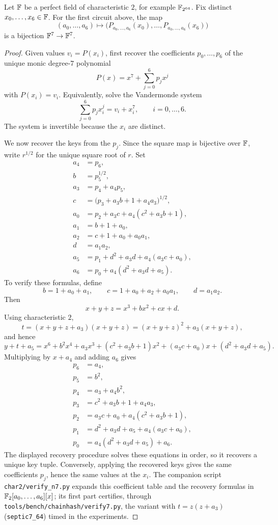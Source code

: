 \begin{lemma}\label{lem:first-char2-circuit-inverse}
Let $\mathbb{F}$ be a perfect field of characteristic $2$, for example $\mathbb{F}_{2^{64}}$.
Fix distinct $x_0,\ldots,x_6\in\mathbb{F}$.
For the first circuit above, the map
\[
    (a_0,\ldots,a_6)
        \longmapsto
    \bigl(P_{a_0,\ldots,a_6}(x_0),\ldots,P_{a_0,\ldots,a_6}(x_6)\bigr)
\]
is a bijection $\mathbb{F}^7\to\mathbb{F}^7$.
\end{lemma}
\begin{proof}
Given values $v_i=P(x_i)$, first recover the coefficients $p_0,\ldots,p_6$ of the unique monic degree-$7$ polynomial
\[
    P(x)=x^7+\sum_{j=0}^6 p_jx^j
\]
with $P(x_i)=v_i$.
Equivalently, solve the Vandermonde system
\[
    \sum_{j=0}^6 p_jx_i^j = v_i+x_i^7,
    \qquad i=0,\ldots,6.
\]
The system is invertible because the $x_i$ are distinct.

We now recover the keys from the $p_j$.
Since the square map is bijective over $\mathbb{F}$, write $r^{1/2}$ for the unique square root of $r$.
Set
\[
\begin{aligned}
    a_4 &= p_6,\\
    b &= p_5^{1/2},\\
    a_3 &= p_4+a_4p_5,\\
    c &= \bigl(p_3+a_3b+1+a_4a_3\bigr)^{1/2},\\
    a_0 &= p_2+a_3c+a_4(c^2+a_3b+1),\\
    a_1 &= b+1+a_0,\\
    a_2 &= c+1+a_0+a_0a_1,\\
    d &= a_1a_2,\\
    a_5 &= p_1+d^2+a_3d+a_4(a_3c+a_0),\\
    a_6 &= p_0+a_4(d^2+a_3d+a_5).
\end{aligned}
\]
To verify these formulas, define
\[
    b=1+a_0+a_1,\qquad
    c=1+a_0+a_2+a_0a_1,\qquad
    d=a_1a_2.
\]
Then
\[
    x+y+z=x^3+bx^2+cx+d.
\]
Using characteristic $2$,
\[
    t=(x+y+z+a_3)(x+y+z)=(x+y+z)^2+a_3(x+y+z),
\]
and hence
\[
    y+t+a_5
    =x^6+b^2x^4+a_3x^3+(c^2+a_3b+1)x^2+(a_3c+a_0)x+(d^2+a_3d+a_5).
\]
Multiplying by $x+a_4$ and adding $a_6$ gives
\[
\begin{aligned}
    p_6 &= a_4,\\
    p_5 &= b^2,\\
    p_4 &= a_3+a_4b^2,\\
    p_3 &= c^2+a_3b+1+a_4a_3,\\
    p_2 &= a_3c+a_0+a_4(c^2+a_3b+1),\\
    p_1 &= d^2+a_3d+a_5+a_4(a_3c+a_0),\\
    p_0 &= a_4(d^2+a_3d+a_5)+a_6.
\end{aligned}
\]
The displayed recovery procedure solves these equations in order, so it recovers a unique key tuple.
Conversely, applying the recovered keys gives the same coefficients $p_j$, hence the same values at the $x_i$.
The companion script \texttt{char2/verify\_n7.py} expands this coefficient
table and the recovery formulas in $\mathbb{F}_2[a_0,\ldots,a_6][x]$; its first part
certifies, through \texttt{tools/bench/chainhash/verify7.py}, the variant with
$t=z(z+a_3)$ (\texttt{septic7\_64}) timed in the experiments.
\end{proof}

